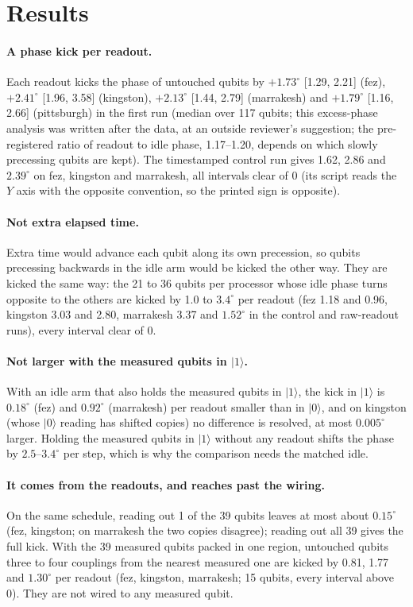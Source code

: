 \documentclass[reprint,amsmath,amssymb,aps,superscriptaddress,nofootinbib]{revtex4-2}
\begin{document}
\section{Results}

\paragraph*{A phase kick per readout.} Each readout kicks the phase of untouched qubits by $+1.73^\circ$ [1.29, 2.21] (fez), $+2.41^\circ$ [1.96, 3.58] (kingston), $+2.13^\circ$ [1.44, 2.79] (marrakesh) and $+1.79^\circ$ [1.16, 2.66] (pittsburgh) in the first run (median over 117 qubits; this excess-phase analysis was written after the data, at an outside reviewer's suggestion; the pre-registered ratio of readout to idle phase, 1.17--1.20, depends on which slowly precessing qubits are kept). The timestamped control run gives 1.62, 2.86 and $2.39^\circ$ on fez, kingston and marrakesh, all intervals clear of 0 (its script reads the $Y$ axis with the opposite convention, so the printed sign is opposite).

\paragraph*{Not extra elapsed time.} Extra time would advance each qubit along its own precession, so qubits precessing backwards in the idle arm would be kicked the other way. They are kicked the same way: the 21 to 36 qubits per processor whose idle phase turns opposite to the others are kicked by 1.0 to $3.4^\circ$ per readout (fez 1.18 and 0.96, kingston 3.03 and 2.80, marrakesh 3.37 and $1.52^\circ$ in the control and raw-readout runs), every interval clear of 0.

\paragraph*{Not larger with the measured qubits in $|1\rangle$.} With an idle arm that also holds the measured qubits in $|1\rangle$, the kick in $|1\rangle$ is $0.18^\circ$ (fez) and $0.92^\circ$ (marrakesh) per readout smaller than in $|0\rangle$, and on kingston (whose $|0\rangle$ reading has shifted copies) no difference is resolved, at most $0.005^\circ$ larger. Holding the measured qubits in $|1\rangle$ without any readout shifts the phase by $2.5$--$3.4^\circ$ per step, which is why the comparison needs the matched idle.

\paragraph*{It comes from the readouts, and reaches past the wiring.} On the same schedule, reading out 1 of the 39 qubits leaves at most about $0.15^\circ$ (fez, kingston; on marrakesh the two copies disagree); reading out all 39 gives the full kick. With the 39 measured qubits packed in one region, untouched qubits three to four couplings from the nearest measured one are kicked by 0.81, 1.77 and $1.30^\circ$ per readout (fez, kingston, marrakesh; 15 qubits, every interval above 0). They are not wired to any measured qubit.
\end{document}
